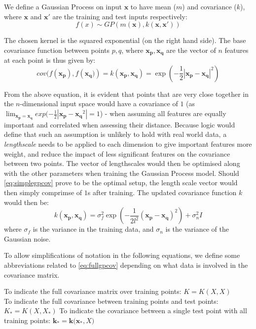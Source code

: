 We define a Gaussian Process on input $\mathbf{x}$ to have mean ($m$) and covariance ($k$), where $\mathbf{x}$ and $\mathbf{x'}$ are the training and test inputs respectively:
\begin{equation}
f(x) \sim GP(m(\mathbf{x}), k(\mathbf{x}, \mathbf{x'}))
\end{equation}

The chosen kernel is the squared exponential (on the right hand side). The base covariance function between points $p, q$, where $\mathbf{x_p, x_q}$ are the vector of $n$ features at each point is thus given by:
\begin{equation}\label{eq:simplegpcov}
    cov(f(\mathbf{x_p}), f(\mathbf{x_q)}) = k(\mathbf{x_p, x_q}) = \exp(-\frac{1}{2}|\mathbf{x_p}-\mathbf{x_q}|^2)
\end{equation}

From the above equation, it is evident that points that are very close together in the $n$-dimensional input space would have a covariance of $1$ (as $\lim_{\mathbf{x_p=x_q}} exp(-\frac{1}{2}|\mathbf{x_p-x_q}^2| = 1$) - when assuming all features are equally important and correlated when assessing their distance. Because logic would define that such an assumption is unlikely to hold with real world data, a \textit{lengthscale} needs to be applied to each dimension to give important features more weight, and reduce the impact of less significant features on the covariance between two points. The vector of lengthscales would then be optimised along with the other parameters when training the Gaussian Process model. Should \ref{eq:simplegpcov} prove to be the optimal setup, the length scale vector would then simply comprimse of $1$s after training. The updated covariance function $k$ would then be:
\begin{equation}\label{eq:fullgpcov}
    k\mathbf{(x_p, x_q)} = \sigma^2_f \exp(-\frac{1}{2l^2} (\mathbf{x_p-x_q})^2) + \sigma^2_nI
\end{equation}
where $\sigma_f$ is the variance in the training data, and $\sigma_n$ is the variance of the Gaussian noise. 

To allow simplifications of notation in the following equations, we define some abbreviations related to \ref{eq:fullgpcov} depending on what data is involved in the covariance matrix. 

To indicate the full covariance matrix over training points: $K = K(X, X)$ \\
To indicate the full covariance between training points and test points: $K_* = K(X, X_*)$
To indicate the covariance between a single test point with all training points: $\mathbf{k_*} = \mathbf{k(x_*}, X)$

